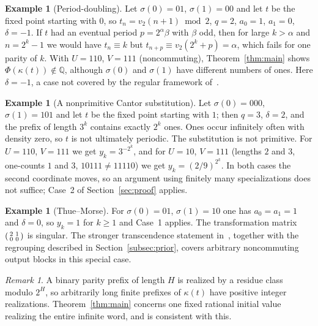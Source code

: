 \documentclass[11pt]{amsart}
\theoremstyle{remark}
\newtheorem{remark}[theorem]{Remark}
\theoremstyle{definition}
\newtheorem{example}[theorem]{Example}
\numberwithin{equation}{section}
\newcommand{\Q}{\mathbb{Q}}
\newcommand{\vt}{v_2}
\begin{document}
\begin{example}[Period-doubling]
Let $\sigma(0)=01$, $\sigma(1)=00$ and let $t$ be the fixed point starting with $0$, so $t_n=\vt(n+1)\bmod2$, $q=2$, $a_0=1$, $a_1=0$, $\delta=-1$. If $t$ had an eventual period $p=2^\alpha\beta$ with $\beta$ odd, then for large $k>\alpha$ and $n=2^k-1$ we would have $t_n\equiv k$ but $t_{n+p}\equiv\vt(2^k+p)=\alpha$, which fails for one parity of $k$. With $U=110$, $V=111$ (noncommuting), Theorem~\ref{thm:main} shows $\Phi(\kappa(t))\notin\Q$, although $\sigma(0)$ and $\sigma(1)$ have different numbers of ones. Here $\delta=-1$, a case not covered by the regular framework of~\cite{LvdP1982}.
\end{example}

\begin{example}[A nonprimitive Cantor substitution]
Let $\sigma(0)=000$, $\sigma(1)=101$ and let $t$ be the fixed point starting with $1$; then $q=3$, $\delta=2$, and the prefix of length $3^k$ contains exactly $2^k$ ones. Ones occur infinitely often with density zero, so $t$ is not ultimately periodic. The substitution is not primitive. For $U=110$, $V=111$ we get $y_k=3^{-2^k}$, and for $U=10$, $V=111$ (lengths $2$ and $3$, one-counts $1$ and $3$, $10111\ne11110$) we get $y_k=(2/9)^{2^k}$. In both cases the second coordinate moves, so an argument using finitely many specializations does not suffice; Case~2 of Section~\ref{sec:proof} applies.
\end{example}

\begin{example}[Thue--Morse]
For $\sigma(0)=01$, $\sigma(1)=10$ one has $a_0=a_1=1$ and $\delta=0$, so $y_k=1$ for $k\ge1$ and Case~1 applies. The transformation matrix $\begin{psmallmatrix}2&1\\0&0\end{psmallmatrix}$ is singular. The stronger transcendence statement in~\cite{Allikvere2026}, together with the regrouping described in Section~\ref{subsec:prior}, covers arbitrary noncommuting output blocks in this special case.
\end{example}

\begin{remark}
A binary parity prefix of length $H$ is realized by a residue class modulo $2^H$, so arbitrarily long finite prefixes of $\kappa(t)$ have positive integer realizations. Theorem~\ref{thm:main} concerns one fixed rational initial value realizing the entire infinite word, and is consistent with this.
\end{remark}
\end{document}

